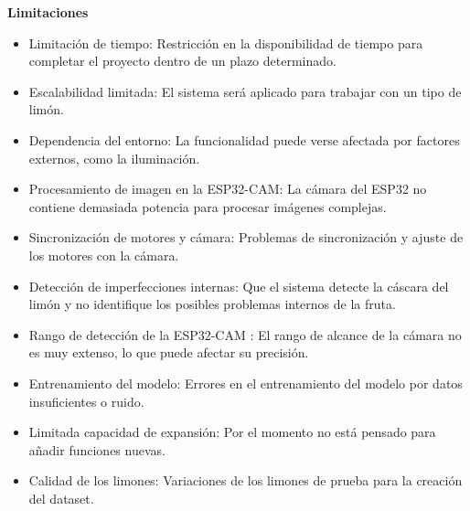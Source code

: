 \textbf{Limitaciones}
\begin{itemize}
    \item Limitación de tiempo: Restricción en la disponibilidad de tiempo para completar el proyecto dentro de un plazo determinado. 
    \item Escalabilidad limitada: El sistema será aplicado para trabajar con un tipo de limón.
    \item Dependencia del entorno: La funcionalidad puede verse afectada por factores externos, como la iluminación. 
    \item Procesamiento de imagen en la ESP32-CAM: La cámara del ESP32 no contiene demasiada potencia para procesar imágenes complejas. 
    \item Sincronización de motores y cámara: Problemas de sincronización y ajuste de los motores con la cámara. 
    \item Detección de imperfecciones internas: Que el sistema detecte la cáscara del limón y no identifique los posibles problemas internos de la fruta. 
    \item Rango de detección de la ESP32-CAM : El rango de alcance de la cámara no es muy extenso, lo que puede afectar su precisión.
    \item Entrenamiento del modelo: Errores en el entrenamiento del modelo por datos insuficientes o ruido. 
    \item Limitada capacidad de expansión: Por el momento no está pensado para añadir funciones nuevas.
    \item Calidad de los limones: Variaciones de los limones de prueba para la creación del dataset.
\end{itemize}

